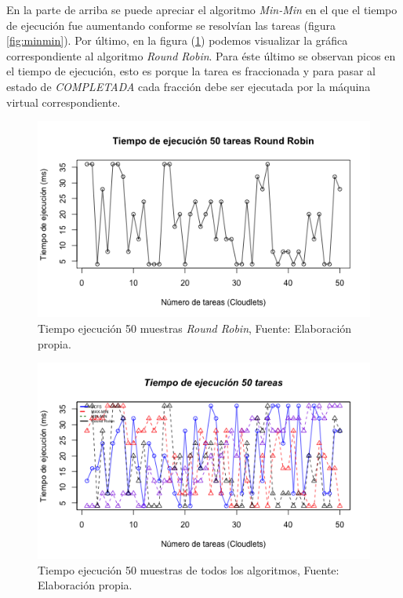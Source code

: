 En la parte de arriba se puede apreciar el algoritmo \textit{Min-Min} en el que el tiempo de ejecuci\'on fue aumentando conforme se resolv\'ian las tareas (figura \ref{fig:minmin}). Por último, en la figura (\ref{fig:roundrobin}) podemos visualizar la gráfica correspondiente al algoritmo \textit{Round Robin}. Para éste último se observan picos en el tiempo de ejecución, esto es porque la tarea es fraccionada y para pasar al estado de \textit{COMPLETADA} cada fracción debe ser ejecutada por la máquina virtual correspondiente.


\renewcommand\thefigure{\arabic{figure}}
\begin{figure}[h!] 
	\centering
	\includegraphics[scale=0.6]{media/roundrobin}
	\caption{Tiempo ejecuci\'on 50 muestras \textit{Round Robin}, Fuente: Elaboraci\'on propia.}
	\label{fig:roundrobin}
\end{figure}

\newpage




\renewcommand\thefigure{\arabic{figure}}
\begin{figure}[h!] 
	\centering
	\includegraphics[scale=0.7]{media/figure}
	\caption{Tiempo ejecuci\'on 50 muestras de todos los algoritmos, Fuente: Elaboraci\'on propia.}
	\label{fig:figure}
\end{figure}

